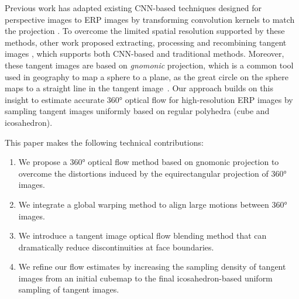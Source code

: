 %
Previous work has adapted existing CNN-based techniques designed for perspective images to ERP images by transforming convolution kernels to match the projection \cite{CoorsCG2018, SuG2019, TatenNT2018}.
%
To overcome the limited spatial resolution supported by these methods, other work proposed extracting, processing and recombining tangent images \cite{EderSLF2020, LuoZSX2019, ZhangLSC2019, LeeJYJY2019, WangHCLYSCS2018, WangYSCT2020}, which supports both CNN-based and traditional methods.
%
%
Moreover, these tangent images are based on \emph{gnomonic} projection, which is a common tool used in geography to map a sphere to a plane, as the great circle on the sphere maps to a straight line in the tangent image~\cite{EderSLF2020}.
%
Our approach builds on this insight to estimate accurate 360° optical flow for high-resolution ERP images by sampling tangent images uniformly based on regular polyhedra (cube and icosahedron).


This paper makes the following technical contributions:
%
\begin{enumerate}[nosep]
\item 
We propose a 360° optical flow method based on gnomonic projection to overcome the distortions induced by the  equirectangular projection of 360° images.

\item
We integrate a global warping method to align large motions  between 360° images.

\item
We introduce a tangent image optical flow blending method that can dramatically reduce discontinuities at face boundaries.

\item 
We refine our flow estimates by increasing the sampling density of tangent images from an initial cubemap to the final icosahedron-based uniform sampling of tangent images.
\end{enumerate}
